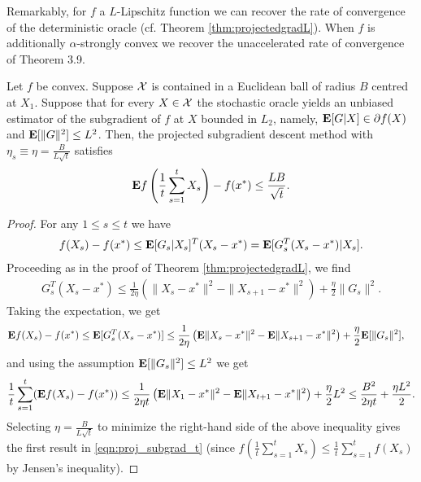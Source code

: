 Remarkably, for $f$ a $L$-Lipschitz function we can recover the rate of convergence of the deterministic oracle (cf. Theorem \ref{thm:projectedgradL}). When $f$ is additionally $\alpha$-strongly convex we recover the unaccelerated rate of convergence of \cite{bubeck} Theorem 3.9.

\begin{theorem}
\label{thm:projectedgradLstoch}
Let $f$ be convex. Suppose $\mathcal{X}$ is contained in a Euclidean ball of radius $B$ centred at $X_1$. Suppose that for every $X \in \mathcal{X}$ the stochastic oracle yields an unbiased estimator of the subgradient of $f$ at $X$ bounded in $L_2$, namely, $\mathbf{E}[G |X]\in \partial f(X)$ and $\mathbf{E}[\|G\|^2] \leq L^2$. Then, the projected subgradient descent method with $\eta_s\equiv\eta = \frac{B}{L\sqrt{t}}$ satisfies 
\begin{equation} \label{eqn:proj_subgrad_t stoch}
\mathbf{E} f\left(\frac{1}{t} \sum_{s=1}^t X_s\right) - f(x^*) \leq \frac{LB}{\sqrt{t}}.
\end{equation}
\begin{proof}
For any $1 \leq s \leq t$ we have
\begin{align*}
	f(X_s) - f(x^*)
	\le \mathbf{E} [G_s|X_s]^T(X_s - x^*)
	= \mathbf{E} [G_s^T(X_s - x^*)|X_s].
\end{align*}
Proceeding as in the proof of Theorem \ref{thm:projectedgradL}, we find
\begin{align*}
	G_s^T(X_s - x^*)
	\le \frac{1}{2\eta} \left( \|X_s - x^*\|^2 - \|X_{s+1} - x^*\|^2 \right) + \frac{\eta}{2} \|G_s\|^2.
\end{align*}
Taking the expectation, we get
\begin{align*}
	\mathbf{E} f(X_s) - f(x^*) &\leq 
	\mathbf{E} [G_s^T(X_s - x^*)]
	\le \frac{1}{2\eta} \left( \mathbf{E}\|X_s - x^*\|^2 - \mathbf{E}\|X_{s+1} - x^*\|^2 \right) + \frac{\eta}{2} \mathbf{E}[\|G_s\|^2],
\end{align*}
and using the assumption $\mathbf{E}[\|G_s\|^2]\le L^2$ we get
\[
\frac{1}{t} \sum_{s=1}^t (\mathbf{E} f(X_s) - f(x^*)) \leq \frac{1}{2 \eta t} \left( \mathbf{E}\| X_1 - x^* \|^2 - \mathbf{E}\| X_{t+1} - x^* \|^2 \right) + \frac{\eta}{2} L^2 \leq \frac{B^2}{2 \eta t} + \frac{\eta L^2 }{2}.
\]
Selecting $\eta = \frac{B}{L\sqrt{t}}$ to minimize the right-hand side of the above inequality gives the first result in \eqref{eqn:proj_subgrad_t} (since $f\left(\frac{1}{t}\sum_{s=1}^t X_s \right) \leq \frac{1}{t} \sum_{s=1}^t f(X_s)$ by Jensen's inequality).
\end{proof}
\end{theorem}



